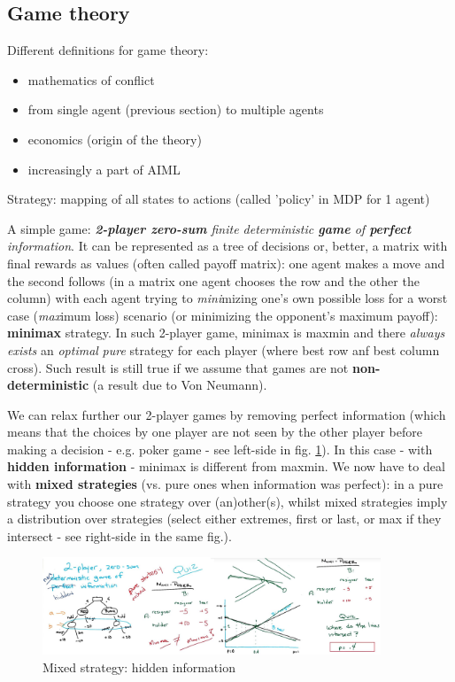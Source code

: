 \documentclass[11pt]{article}
\begin{document}
\subsection{Game theory}
Different definitions for game theory:
\begin{itemize}
	\item mathematics of conflict
	\item from single agent (previous section) to multiple agents
	\item economics (origin of the theory)
	\item increasingly a part of AIML
\end{itemize}

Strategy: mapping of all states to  actions (called 'policy' in MDP for 1 agent) 

A simple game: \textit{\textbf{2-player zero-sum} finite deterministic \textbf{game} of \textbf{perfect} information}. It can be represented as a tree of decisions or, better, a matrix with final rewards as values (often called payoff matrix): one agent makes a move and the second follows (in a matrix one agent chooses the row and the other the column) with each agent trying to \textit{mini}mizing one's own possible loss for a worst case (\textit{max}imum loss) scenario (or minimizing the opponent's maximum payoff): \textbf{minimax} strategy. In such 2-player game, minimax is maxmin and there \textit{always exists} an \textit{optimal} \textit{pure} strategy for each player (where best row anf best column cross). Such result is still true if we assume that games are not \textbf{non-deterministic} (a result due to Von Neumann).

We can relax further our 2-player games by removing perfect information (which means that the choices by one player are not seen by the other player before making a decision - e.g. poker game - see left-side in fig. \ref{mixed_strategy}). In this case - with \textbf{hidden information} - minimax is different from maxmin. We now have to deal with \textbf{mixed strategies} (vs. pure ones when information was perfect): in a pure strategy you choose one strategy over (an)other(s), whilst mixed strategies imply a distribution over strategies (select either extremes, first or last, or max if they intersect - see right-side in the same fig.).
\begin{figure}[htbp] 
	\centering
	\includegraphics[width=0.9\textwidth]{pics/mixed_strategy}
	\caption{Mixed strategy: hidden information} 
	\label{mixed_strategy}
\end{figure}
\end{document}

